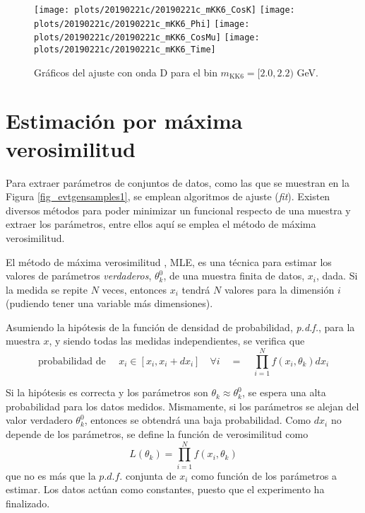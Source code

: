 \begin{figure}[H]
\centering
\begin{multicols}{2}
\texttt{[image: plots/20190221c/20190221c\_mKK6\_CosK]}
\texttt{[image: plots/20190221c/20190221c\_mKK6\_Phi]}
\texttt{[image: plots/20190221c/20190221c\_mKK6\_CosMu]}
\texttt{[image: plots/20190221c/20190221c\_mKK6\_Time]}
\end{multicols}
\vspace*{-0.5cm}
\caption{Gráficos del ajuste con onda D para el bin $m_{\text{KK}6} = [2.0,2.2)$ GeV.}  \label{fig:20190221c_mKK6}
\end{figure}







\section{Estimación por máxima verosimilitud}


Para extraer parámetros de conjuntos de datos, como las que se muestran en la Figura \ref{fig_evtgensamples1}, se emplean algoritmos de ajuste (\emph{fit}). Existen diversos métodos para poder minimizar un funcional respecto de una muestra y extraer los parámetros, entre ellos aquí se emplea el método de máxima verosimilitud.

El método de máxima verosimilitud \cite{cowan}, MLE, es una técnica para estimar los valores de parámetros \emph{verdaderos}, $\theta_k^0$, de una muestra finita de datos, $x_i$, dada. Si la medida se repite $N$ veces, entonces $x_i$ tendrá $N$ valores para la dimensión $i$ (pudiendo tener una variable más dimensiones).



Asumiendo la hipótesis de la función de densidad de probabilidad, \emph{p.d.f.}, para la muestra $x$, y siendo todas las medidas independientes, se verifica que
\begin{equation}
\text{probabilidad de } \quad x_i \in [x_i, x_i+dx_i] \quad \forall i \quad  = \quad \prod_{i=1}^N f(x_i,\theta_k) dx_i	
\end{equation}




Si la hipótesis es correcta y los parámetros son $\theta_k \approx \theta_k^0$, se espera una alta probabilidad para los datos medidos. Mismamente, si los parámetros se alejan del valor verdadero $\theta_k^0$, entonces se obtendrá una baja probabilidad.
Como  $dx_i$ no depende de los parámetros, se define la función de verosimilitud como
\begin{equation}
	L(\theta_k) = \prod_{i=1}^N f(x_i,\theta_k) \label{eq_likelihood_def}
\end{equation}  
que no es más que la \color{dieg} $p.d.f.$ conjunta de $x_i$ como función de los parámetros a estimar. \color{norm} Los datos actúan como constantes, puesto que el experimento ha finalizado.


